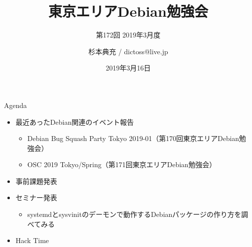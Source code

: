 \title{東京エリアDebian勉強会}
\subtitle{第172回 2019年3月度}
\author{杉本典充 / dictoss@live.jp}
\date{2019年3月16日}



\begin{frame}
\titlepage{}
\end{frame}

\begin{frame}{Agenda}
 \begin{minipage}[t]{0.45\hsize}
  \begin{itemize}
  \item 最近あったDebian関連のイベント報告
    \begin{itemize}
    \item Debian Bug Squash Party Tokyo 2019-01（第170回東京エリアDebian勉強会）
    \item OSC 2019 Tokyo/Spring（第171回東京エリアDebian勉強会）
    \end{itemize}
  \item 事前課題発表
  \end{itemize}
 \end{minipage}
 \begin{minipage}[t]{0.45\hsize}
  \begin{itemize}
  \item セミナー発表
    \begin{itemize}
    \item systemdとsysvinitのデーモンで動作するDebianパッケージの作り方を調べてみる
    \end{itemize}
  \item Hack Time
  \end{itemize}
 \end{minipage}
\end{frame}


